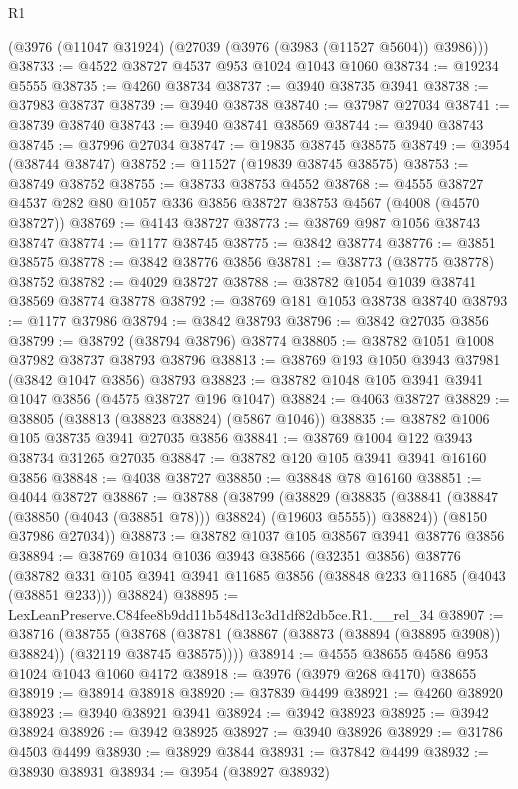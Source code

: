 \begin{lexlean}{R1}
\begin{coremodule}
    (@3976 (@11047 @31924) (@27039 (@3976 (@3983 (@11527 @5604)) @3986)))
@38733 := @4522 @38727 @4537 @953 @1024 @1043 @1060
@38734 := @19234 @5555
@38735 := @4260 @38734
@38737 := @3940 @38735 @3941
@38738 := @37983 @38737
@38739 := @3940 @38738
@38740 := @37987 @27034
@38741 := @38739 @38740
@38743 := @3940 @38741 @38569
@38744 := @3940 @38743
@38745 := @37996 @27034
@38747 := @19835 @38745 @38575
@38749 := @3954 (@38744 @38747)
@38752 := @11527 (@19839 @38745 @38575)
@38753 := @38749 @38752
@38755 := @38733 @38753 @4552
@38768 := @4555 @38727 @4537 @282 @80 @1057 @336 @3856 @38727 @38753 @4567 (@4008 (@4570 @38727))
@38769 := @4143 @38727
@38773 := @38769 @987 @1056 @38743 @38747
@38774 := @1177 @38745
@38775 := @3842 @38774
@38776 := @3851 @38575
@38778 := @3842 @38776 @3856
@38781 := @38773 (@38775 @38778) @38752
@38782 := @4029 @38727
@38788 := @38782 @1054 @1039 @38741 @38569 @38774 @38778
@38792 := @38769 @181 @1053 @38738 @38740
@38793 := @1177 @37986
@38794 := @3842 @38793
@38796 := @3842 @27035 @3856
@38799 := @38792 (@38794 @38796) @38774
@38805 := @38782 @1051 @1008 @37982 @38737 @38793 @38796
@38813 := @38769 @193 @1050 @3943 @37981 (@3842 @1047 @3856) @38793
@38823 := @38782 @1048 @105 @3941 @3941 @1047 @3856 (@4575 @38727 @196 @1047)
@38824 := @4063 @38727
@38829 := @38805 (@38813 (@38823 @38824) (@5867 @1046))
@38835 := @38782 @1006 @105 @38735 @3941 @27035 @3856
@38841 := @38769 @1004 @122 @3943 @38734 @31265 @27035
@38847 := @38782 @120 @105 @3941 @3941 @16160 @3856
@38848 := @4038 @38727
@38850 := @38848 @78 @16160
@38851 := @4044 @38727
@38867 := @38788
    (@38799
      (@38829 (@38835 (@38841 (@38847 (@38850 (@4043 (@38851 @78))) @38824) (@19603 @5555)) @38824))
      (@8150 @37986 @27034))
@38873 := @38782 @1037 @105 @38567 @3941 @38776 @3856
@38894 := @38769
    @1034
    @1036
    @3943
    @38566
    (@32351 @3856)
    @38776
    (@38782 @331 @105 @3941 @3941 @11685 @3856 (@38848 @233 @11685 (@4043 (@38851 @233))) @38824)
@38895 := LexLeanPreserve.C84fee8b9dd11b548d13c3d1df82db5ce.R1.__rel_34
@38907 := @38716
    (@38755
      (@38768 (@38781 (@38867 (@38873 (@38894 (@38895 @3908)) @38824)) (@32119 @38745 @38575))))
@38914 := @4555 @38655 @4586 @953 @1024 @1043 @1060 @4172
@38918 := @3976 (@3979 @268 @4170) @38655
@38919 := @38914 @38918
@38920 := @37839 @4499
@38921 := @4260 @38920
@38923 := @3940 @38921 @3941
@38924 := @3942 @38923
@38925 := @3942 @38924
@38926 := @3942 @38925
@38927 := @3940 @38926
@38929 := @31786 @4503 @4499
@38930 := @38929 @3844
@38931 := @37842 @4499
@38932 := @38930 @38931
@38934 := @3954 (@38927 @38932)

\end{coremodule}
\end{lexlean}
